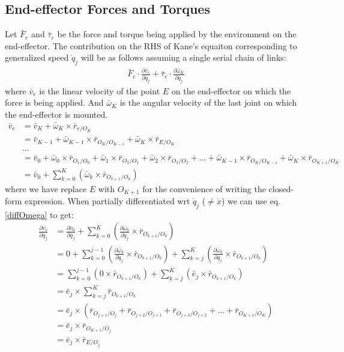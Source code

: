 \documentclass[a4paper,10pt]{article}
\begin{document}
\subsection{End-effector Forces and Torques}
Let $\bar{F}_{e}$ and $\bar\tau_{e}$ be the force and torque being applied by the environment on the end-effector. The contribution on the 
RHS of Kane's equaiton corresponding to generalized speed $\dot{q}_j$ will be as follows assuming a single serial chain of links:
\begin{align}
 \bar{F}_{e} \cdot \frac{\partial \bar{v}_e}{\partial \dot{q}_j} + \bar\tau_{e} \cdot \frac{\partial \bar\omega_K}{\partial \dot{q}_j} \label{endEff1}
\end{align}
where $\bar{v}_e$ is the linear velocity of the point $E$ on the end-effector on which the force is being applied. And $\bar\omega_K$ is the angular velocity
of the last joint on which the end-effector is mounted.
\begin{align}
 \bar{v}_e &= \bar{v}_K + \bar\omega_K \times \bar{r}_{e/O_{K}} \nonumber \\
 &= \bar{v}_{K-1} + \bar\omega_{K-1} \times \bar{r}_{O_{K}/O_{K-1}} + \bar\omega_K \times \bar{r}_{E/O_{K}} \nonumber \\
 &...  \nonumber \\
 &= \bar{v}_0 + \bar\omega_0 \times \bar{r}_{O_1/O_0} + \bar\omega_1 \times \bar{r}_{O_2/O_1} + \bar\omega_2 \times \bar{r}_{O_3/O_2} + ... + \bar\omega_{K-1} \times \bar{r}_{O_{K}/O_{K-1}} + \bar\omega_K \times \bar{r}_{O_{K+1}/O_{K}} \nonumber \\
 &= \bar{v}_0 + \sum\limits_{k=0}^K \left( \bar\omega_k \times \bar{r}_{O_{k+1}/O_k} \right)
\end{align}
where we have replace $E$ with $O_{K+1}$ for the convenience of writing the closed-form expression. When partially differentiated wrt $\dot{q}_j$ ($\neq \dot{x}$)
we can use eq. \ref{diffOmega} to get:
\begin{align}
 \frac{\partial \bar{v}_e}{\partial \dot{q}_j} &= \frac{\partial \bar{v}_0}{\partial \dot{q}_j} + \sum\limits_{k=0}^K \left( \frac{\partial \bar\omega_k}{\partial \dot{q}_j} \times \bar{r}_{O_{k+1}/O_k} \right) \nonumber \\
 &= 0 + \sum\limits_{k=0}^{j-1} \left( \frac{\partial \bar\omega_k}{\partial \dot{q}_j} \times \bar{r}_{O_{k+1}/O_k} \right) 
       + \sum\limits_{k=j}^K \left( \frac{\partial \bar\omega_k}{\partial \dot{q}_j} \times \bar{r}_{O_{k+1}/O_k} \right) \nonumber \\
 &= \sum\limits_{k=0}^{j-1} \left( 0 \times \bar{r}_{O_{k+1}/O_k} \right) + \sum\limits_{k=j}^K \left( \bar{e}_j \times \bar{r}_{O_{k+1}/O_k} \right) \nonumber \\
 &= \bar{e}_j \times \sum\limits_{k=j}^K \bar{r}_{O_{k+1}/O_k} \nonumber \\
 &= \bar{e}_j \times \left( \bar{r}_{O_{j+1}/O_j} + \bar{r}_{O_{j+2}/O_{j+1}} + \bar{r}_{O_{j+3}/O_{j+2}} + ... + \bar{r}_{O_{K+1}/O_K}\right) \nonumber \\
 &= \bar{e}_j \times \bar{r}_{O_{K+1}/O_j} \nonumber \\
 &= \bar{e}_j \times \bar{r}_{E/O_j} \nonumber 
\end{align}
\end{document}
